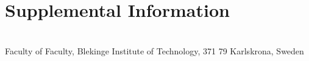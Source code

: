 \documentclass[a4paper,twoside]{bth}
\newcommand{\faculty}{Faculty}
\begin{document}




\appendix
\chapter{Supplemental Information}


\cleardoublepage
\thispagestyle{empty}
\vspace*{\fill}
\clearpage{\thispagestyle{empty}}
\changepage{3cm}{1cm}{-0.5cm}{-0.5cm}{}{-1.5cm}{}{}{}
\vspace*{\fill}
\center

{\bthcsnotextlogo{3cm}}
\\
\noindent\makebox[\linewidth]{\rule{\textwidth}{1pt}} 
Faculty of \faculty, Blekinge Institute of Technology, 371 79 Karlskrona, Sweden
\end{document}
